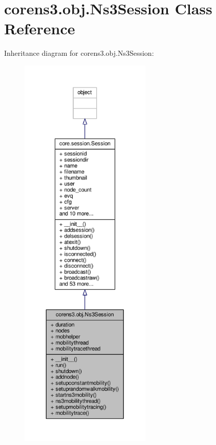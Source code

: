 \hypertarget{classcorens3_1_1obj_1_1_ns3_session}{\section{corens3.\+obj.\+Ns3\+Session Class Reference}
\label{classcorens3_1_1obj_1_1_ns3_session}
}


Inheritance diagram for corens3.\+obj.\+Ns3\+Session\+:
\nopagebreak
\begin{figure}[H]
\begin{center}
\leavevmode
\includegraphics[height=550pt]{classcorens3_1_1obj_1_1_ns3_session__inherit__graph}
\end{center}
\end{figure}


